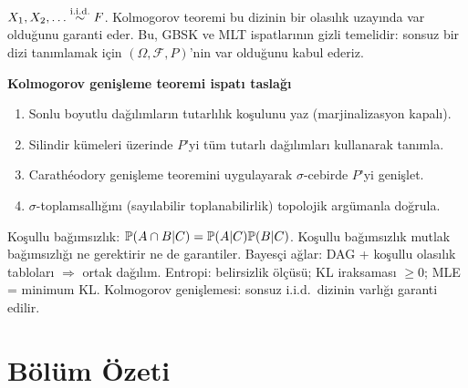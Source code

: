 \begin{ornek}\label{ex:iid_uzay}
$X_1,X_2,\ldots\overset{\text{i.i.d.}}{\sim} F$. Kolmogorov teoremi bu dizinin bir olasılık uzayında var olduğunu garanti eder. Bu, GBSK ve MLT ispatlarının gizli temelidir: sonsuz bir dizi tanımlamak için $(\Omega,\mathcal{F},P)$'nin var olduğunu kabul ederiz.
\end{ornek}

\begin{ispatiskele}
\textbf{Kolmogorov genişleme teoremi ispatı taslağı}
\begin{enumerate}
  \item Sonlu boyutlu dağılımların tutarlılık koşulunu yaz (marjinalizasyon kapalı).
  \item Silindir kümeleri üzerinde $P$'yi tüm tutarlı dağılımları kullanarak tanımla.
  \item Carathéodory genişleme teoremini uygulayarak $\sigma$-cebirde $P$'yi genişlet.
  \item $\sigma$-toplamsallığını (sayılabilir toplanabilirlik) topolojik argümanla doğrula.
\end{enumerate}
\end{ispatiskele}

\begin{mikroozet}
Koşullu bağımsızlık: $\mathbb{P}(A\cap B|C) = \mathbb{P}(A|C)\mathbb{P}(B|C)$.
Koşullu bağımsızlık mutlak bağımsızlığı ne gerektirir ne de garantiler.
Bayesçi ağlar: DAG + koşullu olasılık tabloları $\Rightarrow$ ortak dağılım.
Entropi: belirsizlik ölçüsü; KL iraksaması $\geq0$; MLE = minimum KL.
Kolmogorov genişlemesi: sonsuz i.i.d.\ dizinin varlığı garanti edilir.
\end{mikroozet}

\section*{Bölüm Özeti}

